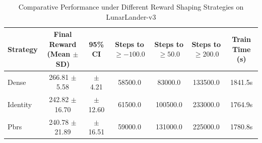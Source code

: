 \begin{table}[t]
\centering
\caption{Comparative Performance under Different Reward Shaping Strategies on LunarLander-v3}
\label{tab:reward_shaping_comparison}
\begin{tabular}{lcccccc}
\hline
\textbf{Strategy} & \textbf{Final Reward (Mean $\pm$ SD)} & \textbf{95\% CI} & \textbf{Steps to $\ge -100.0$} & \textbf{Steps to $\ge 50.0$} & \textbf{Steps to $\ge 200.0$} & \textbf{Train Time (s)} \\
\hline
Dense & 266.81 $\pm$ 5.58 & $\pm$ 4.21 & 58500.0 & 83000.0 & 133500.0 & 1841.5s \\
Identity & 242.82 $\pm$ 16.70 & $\pm$ 12.60 & 61500.0 & 100500.0 & 233000.0 & 1764.9s \\
Pbrs & 240.78 $\pm$ 21.89 & $\pm$ 16.51 & 59000.0 & 131000.0 & 225000.0 & 1780.8s \\
\hline
\end{tabular}
\end{table}
